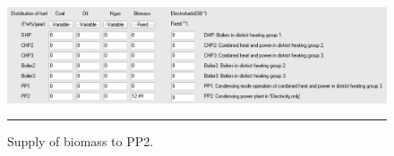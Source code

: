 \begin{figure}[htbp]
	\centering
	\includegraphics[width=\textwidth]{figures/B02_BM.png}
	\rule{\textwidth}{0.5pt} %
	\caption{Supply of biomass to PP2.}
	\label{fig:B02-BM}
\end{figure}